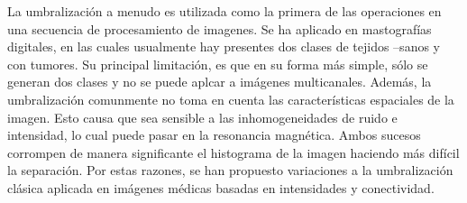 \documentclass[12pt]{report}
\begin{document}
La umbralización a menudo es utilizada como la primera de las operaciones en una secuencia de procesamiento de imagenes. Se ha aplicado en mastografías digitales, en las cuales usualmente hay presentes dos clases de tejidos --sanos y con tumores. Su principal limitación, es que en su forma más simple, sólo se generan dos clases y no se puede aplcar a imágenes multicanales. Además, la umbralización comunmente no toma en cuenta las características espaciales de la imagen. Esto causa que sea sensible a las inhomogeneidades de ruido e intensidad, lo cual puede pasar en la resonancia magnética. Ambos sucesos corrompen de manera significante el histograma de la imagen haciendo más difícil la separación. Por estas razones, se han propuesto variaciones a la umbralización clásica aplicada en imágenes médicas basadas en intensidades y conectividad. 
\end{document}
